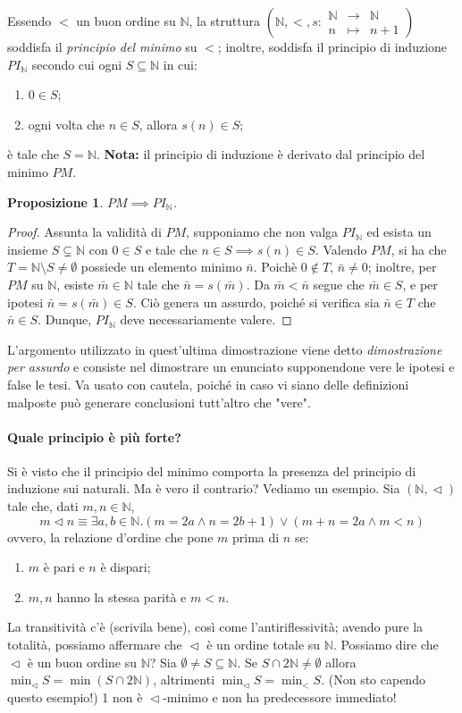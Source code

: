 \documentclass[fontsize = 11 pt, paper=A4, oneside, index=totoc, hyperref]{book}
\theoremstyle{definition}
\theoremstyle{plain}
\newtheorem{prp}{Proposizione}[section]
\newcommand{\N}{\mathbb{N}}
\newcommand{\order}{\vartriangleleft}
\begin{document}
Essendo \(<\) un buon ordine su \(\N\), la struttura \(\left(\N, <, s \colon \begin{matrix}\N & \to & \N \\ n & \mapsto & n+1\end{matrix}\right)\) soddisfa il \emph{principio del minimo} su \(<\); inoltre, soddisfa il principio di induzione \(PI_\N\) secondo cui ogni \(S \subseteq \N\) in cui:
\begin{enumerate}
  \item \(0 \in S\);
  \item ogni volta che \(n \in S\), allora \(s(n) \in S\);
\end{enumerate}
è tale che \(S = \N\). {\bf Nota:} il principio di induzione è derivato dal principio del minimo \(PM\).
\begin{prp}
  \(PM \implies PI_\N\).
\end{prp}
\begin{proof}
  Assunta la validità di \(PM\), supponiamo che non valga \(PI_\N\) ed esista un insieme \(S \subsetneq \N\) con \(0 \in S\) e tale che \(n \in S \implies s(n) \in S\). Valendo \(PM\), si ha che \(T = \N \setminus S \neq \emptyset\) possiede un elemento minimo \(\bar{n}\). Poichè \(0 \notin T\), \(\bar{n} \neq 0\); inoltre, per \(PM\) su \(\N\), esiste \(\bar{m} \in \N\) tale che \(\bar{n} = s(\bar{m})\).
  Da \(\bar{m} < \bar{n}\) segue che \(\bar{m} \in S\), e per ipotesi \(\bar{n} = s(\bar{m}) \in S\). Ciò genera un assurdo, poiché si verifica sia \(\bar{n} \in T\) che \(\bar{n} \in S\). Dunque, \(PI_\N\) deve necessariamente valere.
\end{proof}
L'argomento utilizzato in quest'ultima dimostrazione viene detto \emph{dimostrazione per assurdo} e consiste nel dimostrare un enunciato supponendone vere le ipotesi e false le tesi. Va usato con cautela, poiché in caso vi siano delle definizioni malposte può generare conclusioni tutt'altro che "vere".

\paragraph{Quale principio è più forte?} Si è visto che il principio del minimo comporta la presenza del principio di induzione sui naturali. Ma è vero il contrario? Vediamo un esempio. Sia \((\N, \order)\) tale che, dati \(m, n \in \N\),
\[
m \order n\equiv \exists a,b \in \N. (m = 2a \land n = 2b+1) \lor (m + n = 2a \land m < n)
\]
ovvero, la relazione d'ordine che pone \(m\) prima di \(n\) se:
\begin{enumerate}
  \item \(m\) è pari e \(n\) è dispari;
  \item \(m,n\) hanno la stessa parità e \(m < n\).
\end{enumerate}
La transitività c'è (scrivila bene), così come l'antiriflessività; avendo pure la totalità, possiamo affermare che \(\order\) è un ordine totale su \(\N\). Possiamo dire che \(\order\) è un buon ordine su \(\N\)?
Sia \(\emptyset \neq S \subseteq \N\). Se \(S \cap 2\N \neq \emptyset\) allora \(\min_{\order} S = \min(S\cap2\N)\), altrimenti \(\min_{\order} S = \min_{<} S\). (Non sto capendo questo esempio!) 1 non è \(\order\)-minimo e non ha predecessore immediato!
\end{document}
